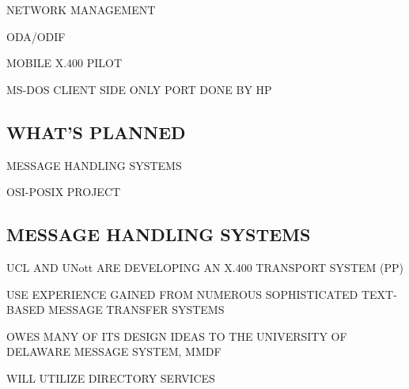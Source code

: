 \begin{bwslide}

\begin{nrtc}
\item	NETWORK MANAGEMENT

\item	ODA/ODIF

\item	MOBILE X.400 PILOT
    \begin{nrtc}
    \item	MS-DOS CLIENT SIDE ONLY PORT DONE BY HP
    \end{nrtc}
\end{nrtc}
\end{bwslide}


\begin{bwslide}
\part	{WHAT'S PLANNED}\bf

\begin{nrtc}
\item	MESSAGE HANDLING SYSTEMS

\item	OSI-POSIX PROJECT
\end{nrtc}
\end{bwslide}


\begin{bwslide}
\part*	{MESSAGE HANDLING SYSTEMS}

\begin{nrtc}
\item	UCL AND UNott ARE DEVELOPING AN X.400 TRANSPORT SYSTEM (PP)

\item	USE EXPERIENCE GAINED FROM NUMEROUS SOPHISTICATED TEXT-BASED MESSAGE
	TRANSFER SYSTEMS

\item	OWES MANY OF ITS DESIGN IDEAS TO THE UNIVERSITY OF DELAWARE MESSAGE
	SYSTEM, MMDF

\item	WILL UTILIZE DIRECTORY SERVICES
\end{nrtc}
\end{bwslide}


